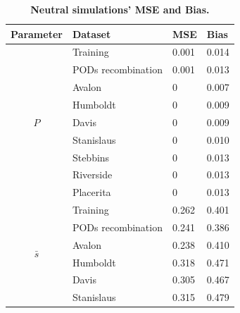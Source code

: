 \documentclass[a4paper, 12pt]{article}
\begin{document}
\begin{table}[ht]
\caption{\textbf{Neutral simulations' MSE and Bias.}}
\centering
\begin{tabular}{clll}
\hline
\multicolumn{1}{l}{Parameter}            & Dataset            & MSE   & Bias  \\ 
\hline
\multirow{9}{*}{$P$}                            & Training           & 0.001  & 0.014  \\
                                                           & PODs recombination & 0.001 & 0.013 \\
                                                           & Avalon             &  0     & 0.007 \\
                                                           & Humboldt        & 0      & 0.009  \\
                                                           & Davis               & 0      & 0.009  \\
                                                           & Stanislaus       & 0       & 0.010 \\
                                                           & Stebbins          & 0      & 0.013  \\
                                                           & Riverside         & 0      & 0.013  \\
                                                           & Placerita          &  0     & 0.013  \\ 
\hline
\multirow{9}{*}{$\bar{s}$}                    & Training           & 0.262  & 0.401 \\
                                                           & PODs recombination & 0.241 & 0.386 \\
                                                           & Avalon             & 0.238           & 0.410 \\
                                                           & Humboldt           & 0.318 &0.471 \\
                                                           & Davis              & 0.305 & 0.467 \\
                                                           & Stanislaus         & 0.315 & 0.479 \\

\end{tabular}
\end{table}
\end{document}
